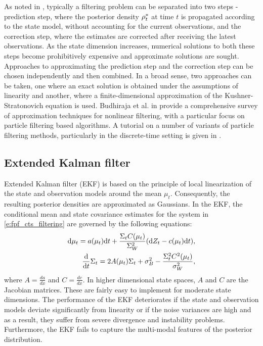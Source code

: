 As noted in , typically a filtering problem can be separated into two steps - prediction step, where the posterior density $\rho^*_t$ at time $t$ is propagated according to the state model, without accounting for the current observations, and the correction step, where the estimates are corrected after receiving the latest observations. As the state dimension increases, numerical solutions to both these steps become prohibitively expensive and approximate solutions are sought. Approaches to approximating the prediction step and the correction step can be chosen independently and then combined. In a broad sense, two approaches can be taken, one where an exact solution is obtained under the assumptions of linearity and another, where a finite-dimensional approximation of the Kushner-Stratonovich equation is used. Budhiraja et al. in \cite{budchelee07} provide a comprehensive survey of approximation techniques for nonlinear filtering, with a particular focus on particle filtering based algorithms. A tutorial on a number of variants of particle filtering methods, particularly in the discrete-time setting is given in \cite{arumasgorcla02}.
\subsection{Extended Kalman filter}
\label{s:ekf}
Extended Kalman filter (EKF) \cite{jaz70} is based on the principle of local linearization of the state and observation models around the mean $\mu_t$. Consequently, the resulting posterior densities are approximated as Gaussians. In the EKF, the conditional mean and state covariance estimates for the system in \eqref{e:fpf_cts_filtering} are governed by the following equations: 
\begin{align}
\ud \mu_t = a(\mu_t) \ud t + \frac{\Sigma_t C(\mu_t)}{\Sigma^2_W} (\ud Z_t - c(\mu_t) \ud t), \\
\frac{\ud}{\ud t} \Sigma_t = 2 A(\mu_t) \Sigma_t  + \sigma^2_B - \frac{\Sigma^2_t C^2(\mu_t)}{\sigma^2_W}, 
\label{e:fpf_ekf}
\end{align}
where $A = \frac{d a}{dx}$ and $C = \frac{d c}{dx}$. In higher dimensional state spaces, $A$ and $C$ are the Jacobian matrices. These are fairly easy to implement for moderate state dimensions. The performance of the EKF deteriorates if the state and observation models deviate significantly from linearity or if the noise variances are high and as a result, they suffer from severe divergence and instability problems. Furthermore, the EKF fails to capture the multi-modal features of the posterior distribution.
